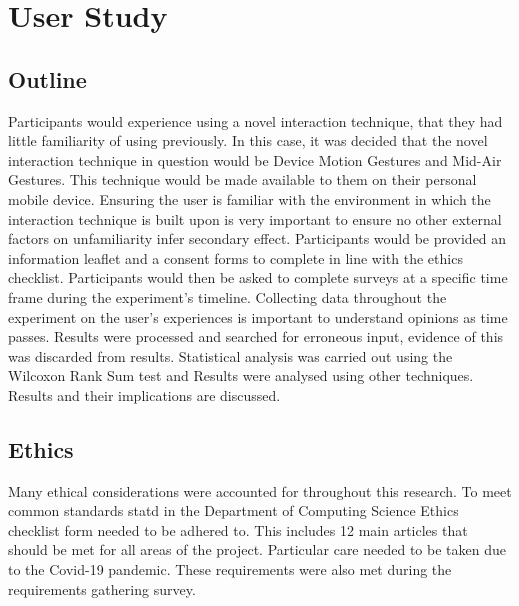 \documentclass{l4proj}
\begin{document}

\chapter{User Study}

\section{Outline}
Participants would experience using a novel interaction technique, that they had little familiarity of using previously. In this case, it was decided that the novel interaction technique in question would be Device Motion Gestures and Mid-Air Gestures. This technique would be made available to them on their personal mobile device. Ensuring the user is familiar with the environment in which the interaction technique is built upon is very important to ensure no other external factors on unfamiliarity infer secondary effect. Participants would be provided an information leaflet and a consent forms to complete in line with the ethics checklist. Participants would then be asked to complete surveys at a specific time frame during the experiment’s timeline. Collecting data throughout the experiment on the user’s experiences is important to understand opinions as time passes. Results were processed and searched for erroneous input, evidence of this was discarded from results. Statistical analysis was carried out using the Wilcoxon Rank Sum test and Results were analysed using other techniques. Results and their implications are discussed.

\section{Ethics}
Many ethical considerations were accounted for throughout this research. To meet common standards statd in the Department of Computing Science Ethics checklist form needed to be adhered to. This includes 12 main articles that should be met for all areas of the project. Particular care needed to be taken due to the Covid-19 pandemic. These requirements were also met during the requirements gathering survey.
\end{document}
